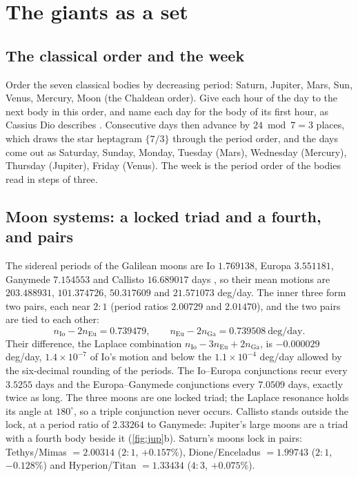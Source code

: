 \documentclass[11pt]{article}
\theoremstyle{definition}\newtheorem{definition}[theorem]{Definition}
\theoremstyle{remark}\newtheorem{remark}[theorem]{Remark}
\begin{document}
\section{The giants as a set}\label{sec:set}
\subsection{The classical order and the week}\label{sec:week}
Order the seven classical bodies by decreasing period: Saturn, Jupiter, Mars, Sun, Venus, Mercury, Moon (the Chaldean order). Give each hour of the day to the next body in this order, and name each day for the body of its first hour, as Cassius Dio describes \cite{Dio}. Consecutive days then advance by $24\bmod7=3$ places, which draws the star heptagram $\{7/3\}$ through the period order, and the days come out as Saturday, Sunday, Monday, Tuesday (Mars), Wednesday (Mercury), Thursday (Jupiter), Friday (Venus). The week is the period order of the bodies read in steps of three.

\subsection{Moon systems: a locked triad and a fourth, and pairs}\label{sec:moons}
The sidereal periods of the Galilean moons are Io $1.769138$, Europa $3.551181$, Ganymede $7.154553$ and Callisto $16.689017$ days \cite{NSSDCJsat}, so their mean motions are $203.488931$, $101.374726$, $50.317609$ and $21.571073$ deg/day. The inner three form two pairs, each near $2{:}1$ (period ratios $2.00729$ and $2.01470$), and the two pairs are tied to each other:
\[
n_\mathrm{Io}-2n_\mathrm{Eu}=0.739479,\qquad n_\mathrm{Eu}-2n_\mathrm{Ga}=0.739508\ \text{deg/day}.
\]
Their difference, the Laplace combination $n_\mathrm{Io}-3n_\mathrm{Eu}+2n_\mathrm{Ga}$, is $-0.000029$ deg/day, $1.4\times10^{-7}$ of Io's motion and below the $1.1\times10^{-4}$ deg/day allowed by the six-decimal rounding of the periods. The Io--Europa conjunctions recur every $3.5255$ days and the Europa--Ganymede conjunctions every $7.0509$ days, exactly twice as long. The three moons are one locked triad; the Laplace resonance holds its angle at $180^\circ$, so a triple conjunction never occurs. Callisto stands outside the lock, at a period ratio of $2.33264$ to Ganymede: Jupiter's large moons are a triad with a fourth body beside it (\cref{fig:jup}b). Saturn's moons \cite{NSSDCSsat} lock in pairs: Tethys/Mimas $=2.00314$ ($2{:}1$, $+0.157\%$), Dione/Enceladus $=1.99743$ ($2{:}1$, $-0.128\%$) and Hyperion/Titan $=1.33434$ ($4{:}3$, $+0.075\%$).
\end{document}
